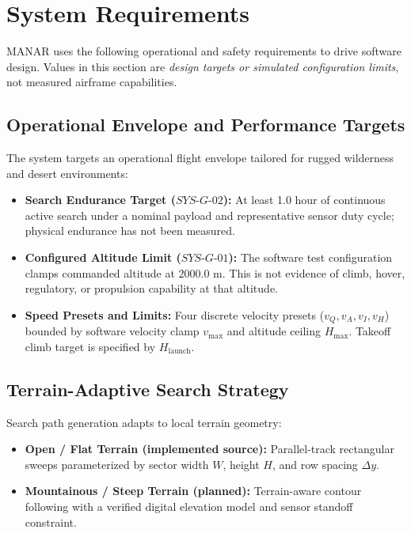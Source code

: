 \section{System Requirements}

MANAR uses the following operational and safety requirements to drive software design. Values in this section are \emph{design targets or simulated configuration limits}, not measured airframe capabilities.

\subsection{Operational Envelope and Performance Targets}
The system targets an operational flight envelope tailored for rugged wilderness and desert environments:
\begin{itemize}
    \item \textbf{Search Endurance Target ($SYS\text{-}G\text{-}02$):} At least 1.0 hour of continuous active search under a nominal payload and representative sensor duty cycle; physical endurance has not been measured.
    \item \textbf{Configured Altitude Limit ($SYS\text{-}G\text{-}01$):} The software test configuration clamps commanded altitude at $2000.0\text{ m}$. This is not evidence of climb, hover, regulatory, or propulsion capability at that altitude.
    \item \textbf{Speed Presets and Limits:} Four discrete velocity presets ($v_Q, v_A, v_I, v_H$) bounded by software velocity clamp $v_{\max}$ and altitude ceiling $H_{\max}$. Takeoff climb target is specified by $H_{\mathrm{launch}}$.
\end{itemize}

\subsection{Terrain-Adaptive Search Strategy}
Search path generation adapts to local terrain geometry:
\begin{itemize}
    \item \textbf{Open / Flat Terrain (implemented source):} Parallel-track rectangular sweeps parameterized by sector width $W$, height $H$, and row spacing $\Delta y$.
    \item \textbf{Mountainous / Steep Terrain (planned):} Terrain-aware contour following with a verified digital elevation model and sensor standoff constraint.
\end{itemize}

